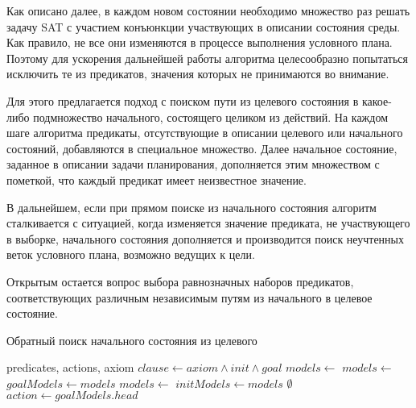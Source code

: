 Как описано далее, в каждом новом состоянии необходимо множество раз решать задачу SAT с участием конъюнкции участвующих в описании состояния среды. Как правило, не все они изменяются в процессе выполнения условного плана. Поэтому для ускорения дальнейшей работы алгоритма целесообразно попытаться исключить те из предикатов, значения которых не принимаются во внимание.

Для этого предлагается подход с поиском пути из целевого состояния в какое-либо подмножество начального, состоящего целиком из действий. На каждом шаге алгоритма предикаты, отсутствующие в описании целевого или начального состояний, добавляются в специальное множество. Далее начальное состояние, заданное в описании задачи планирования, дополняется этим множеством с пометкой, что каждый предикат имеет неизвестное значение.

В дальнейшем, если при прямом поиске из начального состояния алгоритм сталкивается с ситуацией, когда изменяется значение предиката, не участвующего в выборке, начального состояния дополняется и производится поиск неучтенных веток условного плана, возможно ведущих к цели.

Открытым остается вопрос выбора равнозначных наборов предикатов, соответствующих различным независимым путям из начального в целевое состояние.


\begin{algorithm}
 \caption{Обратный поиск начального состояния из целевого}
 \begin{algorithmic}
  \Require predicates, actions, axiom
    \State $clause \gets axiom \land init \land goal$
    \State $models \gets $ 
      \State \Return {}
	\State \Return {}
    \EndIf
  \EndFunction
      \State $models \gets$ 
	\State $goalModels \gets models$
      \EndIf
      \State $models \gets$ 
	\State $initModels \gets models$
      \EndIf
    \EndFor
      \State \Return $\emptyset$
      \State $action \gets goalModels.head$
      \State \Return {}
    \EndIf
  \EndFunction
 \end{algorithmic}
\end{algorithm}

